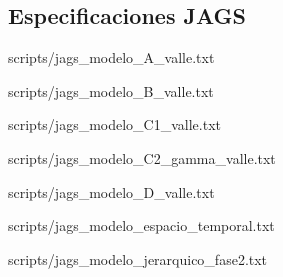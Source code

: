 ﻿\documentclass[12pt]{article}
\begin{document}
\subsection*{Especificaciones JAGS}

%
  {scripts/jags_modelo_A_valle.txt}

%
  {scripts/jags_modelo_B_valle.txt}

%
  {scripts/jags_modelo_C1_valle.txt}

%
  {scripts/jags_modelo_C2_gamma_valle.txt}

%
  {scripts/jags_modelo_D_valle.txt}

%
  {scripts/jags_modelo_espacio_temporal.txt}

%
  {scripts/jags_modelo_jerarquico_fase2.txt}
\end{document}
